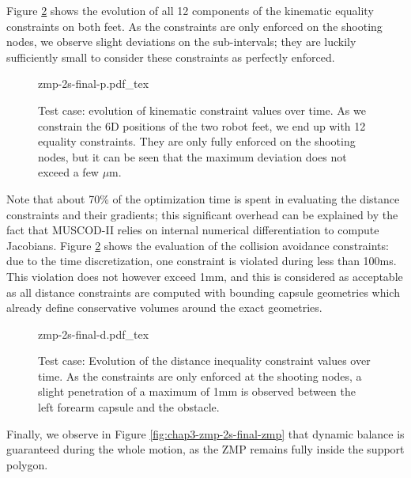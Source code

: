 Figure \ref{fig:chap3-zmp-2s-final-d} shows the evolution of all 12
components of the kinematic equality constraints on both feet. As the
constraints are only enforced on the shooting nodes, we observe slight
deviations on the sub-intervals; they are luckily sufficiently small
to consider these constraints as perfectly enforced.

\begin{figure}
  \centering
      {\def\svgwidth{0.8\linewidth}
        {\scriptsize
          
                     {zmp-2s-final-p.pdf_tex}
        }
      }
  \caption{Test case: evolution of kinematic constraint values over
    time. As we constrain the 6D positions of the two robot feet, we
    end up with 12 equality constraints. They are only fully enforced
    on the shooting nodes, but it can be seen that the maximum
    deviation does not exceed a few $\mu$m.}
  \label{fig:chap3-zmp-2s-final-p}
\end{figure}

Note that about 70\% of the optimization time is spent in evaluating
the distance constraints and their gradients; this significant
overhead can be explained by the fact that \textsc{MUSCOD-II} relies
on internal numerical differentiation to compute Jacobians. Figure
\ref{fig:chap3-zmp-2s-final-d} shows the evaluation of the collision
avoidance constraints: due to the time discretization, one constraint
is violated during less than 100ms. This violation does not however
exceed 1mm, and this is considered as acceptable as all distance
constraints are computed with bounding capsule geometries which
already define conservative volumes around the exact geometries.

\begin{figure}
  \centering
      {\def\svgwidth{0.8\linewidth}
        {\scriptsize
          
                     {zmp-2s-final-d.pdf_tex}
        }
      }
  \caption{Test case: Evolution of the distance inequality constraint
    values over time. As the constraints are only enforced at the
    shooting nodes, a slight penetration of a maximum of 1mm is
    observed between the left forearm capsule and the obstacle.}
  \label{fig:chap3-zmp-2s-final-d}
\end{figure}

Finally, we observe in Figure \ref{fig:chap3-zmp-2s-final-zmp} that
dynamic balance is guaranteed during the whole motion, as the ZMP
remains fully inside the support polygon.

